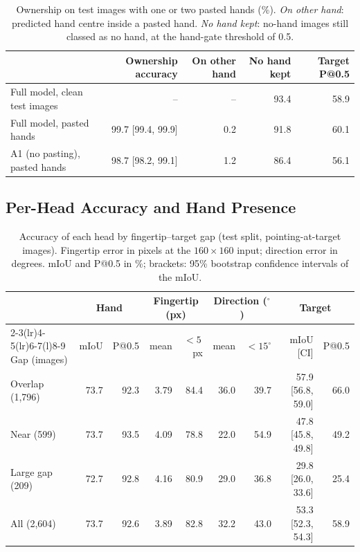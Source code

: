 \begin{table}[h]
  \caption{Ownership on test images with one or two pasted hands (\%). \emph{On other hand}: predicted hand centre inside a pasted hand. \emph{No hand kept}: no-hand images still classed as no hand, at the hand-gate threshold of 0.5.}
  \label{tab:own}
  \footnotesize
  \begin{tabular}{lrrrr}
    \toprule
    & Ownership accuracy & On other hand & No hand kept & Target P@0.5 \\
    \midrule
    Full model, clean test images & -- & -- & 93.4 & 58.9 \\
    Full model, pasted hands & 99.7 [99.4, 99.9] & 0.2 & 91.8 & 60.1 \\
    A1 (no pasting), pasted hands & 98.7 [98.2, 99.1] & 1.2 & 86.4 & 56.1 \\
    \bottomrule
  \end{tabular}
\end{table}

\subsection{Per-Head Accuracy and Hand Presence}\label{app:heads}

\begin{table}[h]
  \caption{Accuracy of each head by fingertip--target gap (test split, pointing-at-target images). Fingertip error in pixels at the $160\times160$ input; direction error in degrees. mIoU and P@0.5 in \%; brackets: 95\% bootstrap confidence intervals of the mIoU.}
  \label{tab:heads}
  \footnotesize
  \setlength{\tabcolsep}{4pt}
  \begin{tabular}{lrrrrrrrr}
    \toprule
    & \multicolumn{2}{c}{Hand} & \multicolumn{2}{c}{Fingertip (px)} & \multicolumn{2}{c}{Direction ($^\circ$)} & \multicolumn{2}{c}{Target} \\
    \cmidrule(lr){2-3}\cmidrule(lr){4-5}\cmidrule(lr){6-7}\cmidrule(l){8-9}
    Gap (images) & mIoU & P@0.5 & mean & ${<}5$\,px & mean & ${<}15^\circ$ & mIoU [CI] & P@0.5 \\
    \midrule
    Overlap (1,796) & 73.7 & 92.3 & 3.79 & 84.4 & 36.0 & 39.7 & 57.9 [56.8, 59.0] & 66.0 \\
    Near (599) & 73.7 & 93.5 & 4.09 & 78.8 & 22.0 & 54.9 & 47.8 [45.8, 49.8] & 49.2 \\
    Large gap (209) & 72.7 & 92.8 & 4.16 & 80.9 & 29.0 & 36.8 & 29.8 [26.0, 33.6] & 25.4 \\
    \midrule
    All (2,604) & 73.7 & 92.6 & 3.89 & 82.8 & 32.2 & 43.0 & 53.3 [52.3, 54.3] & 58.9 \\
    \bottomrule
  \end{tabular}
\end{table}

